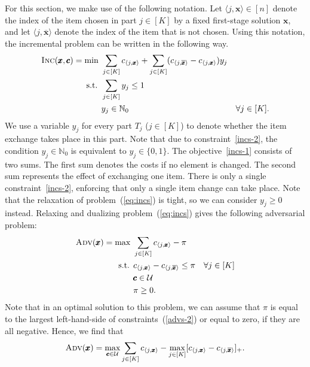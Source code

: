 \documentclass[a4paper,11pt,abstracton]{scrartcl}
\theoremstyle{definition}
\theoremstyle{remark}
\newcommand{\nn}{\mathbb{N}}
\newcommand{\cU}{\mathcal{U}}
\begin{document}
For this section, we make use of the following notation. Let $\langle j,\pmb{x}\rangle\in[n]$ denote the index of the item chosen in part $j\in [K]$ by a fixed first-stage solution $\pmb{x}$, and let $\langle j,\overline{\pmb{x}}\rangle$ denote the index of the item that is not chosen. Using this notation, the incremental problem can be written in the following way.
\begin{subequations}
\label{eq:incs}  
\begin{align}
\textsc{Inc}(\pmb{x},\pmb{c}) = \min\ & \sum_{j\in[K]} c_{\langle j,\pmb{x}\rangle} + \sum_{j\in[K]} (c_{\langle j,\overline{\pmb{x}}\rangle}  - c_{\langle j, \pmb{x} \rangle}) y_j \label{incs-1} \\
\text{s.t. } & \sum_{j\in[K]} y_j \le 1 \label{incs-2}\\
& y_j \in \mathbb{N}_0 & \forall j\in[K]. \label{incs-3}
\end{align}
\end{subequations}
We use a variable $y_j$ for every part $T_j$  ($j\in[K]$) to denote whether the item exchange takes place in this part. Note that due to constraint~\eqref{incs-2}, the condition $y_j \in \nn_0$ is equivalent to $y_j \in \{0,1\}$. The objective~\eqref{incs-1} consists of two sums. The first sum denotes the costs if no element is changed. The second sum represents the effect of exchanging one item. There is only a single constraint~\eqref{incs-2}, enforcing that only a single item change can take place. Note that the relaxation of problem~(\ref{eq:incs}) is tight, so we can consider $y_j \geq 0$ instead. Relaxing and dualizing problem~(\ref{eq:incs}) gives the following adversarial problem:
\begin{subequations}
\label{eq:advs}  
\begin{align}
\textsc{Adv}(\pmb{x}) = \max\ & \sum_{j\in[K]} c_{\langle j, \pmb{x} \rangle} - \pi \label{advs-1} \\
\text{s.t. } & c_{\langle j, \pmb{x} \rangle} - c_{\langle j, \overline{\pmb{x}}\rangle} \le \pi & \forall j\in[K] \label{advs-2}\\
& \pmb{c}\in\cU \label{advs-3}\\
& \pi \ge 0. \label{advs-4}
\end{align}
\end{subequations}
Note that in an optimal solution to this problem, we can assume that $\pi$ is equal to the largest left-hand-side of constraints~(\ref{advs-2}) or equal to zero, if they are all negative. Hence, we find that
\begin{equation}
\textsc{Adv}(\pmb{x}) =  \max_{\pmb{c}\in\cU} \sum_{j\in[K]} c_{\langle j, \pmb{x} \rangle} - \max_{j\in[K]} [c_{\langle j, \pmb{x} \rangle} - c_{\langle j, \overline{\pmb{x}} \rangle}]_+. 
\label{eq:adv_problem_pj_1_short}
\end{equation}
\end{document}

